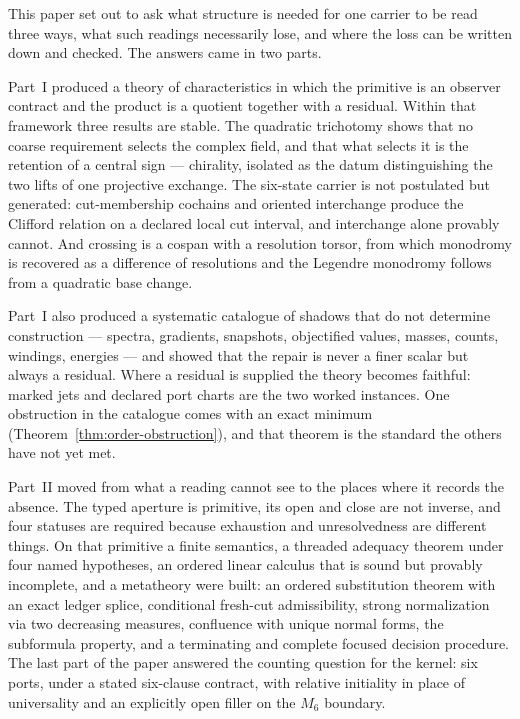 \label{sec:conclusion-body}

This paper set out to ask what structure is needed for one carrier to be read three ways,
what such readings necessarily lose, and where the loss can be written down and checked.  The
answers came in two parts.

Part~I produced a theory of characteristics in which the primitive is an observer contract
and the product is a quotient together with a residual.  Within that framework three results
are stable.  The quadratic trichotomy shows that no coarse requirement selects the complex
field, and that what selects it is the retention of a central sign --- chirality, isolated as
the datum distinguishing the two lifts of one projective exchange.  The six-state carrier is
not postulated but generated: cut-membership cochains and oriented interchange produce the
Clifford relation on a declared local cut interval, and interchange alone provably cannot.
And crossing is a cospan with a resolution torsor, from which monodromy is recovered as a
difference of resolutions and the Legendre monodromy follows from a quadratic base change.

Part~I also produced a systematic catalogue of shadows that do not determine construction ---
spectra, gradients, snapshots, objectified values, masses, counts, windings, energies --- and
showed that the repair is never a finer scalar but always a residual.  Where a residual is
supplied the theory becomes faithful: marked jets and declared port charts are the two
worked instances.  One obstruction in the catalogue comes with an exact minimum
(Theorem~\ref{thm:order-obstruction}), and that theorem is the standard the others have not
yet met.

Part~II moved from what a reading cannot see to the places where it records the absence.  The
typed aperture is primitive, its open and close are not inverse, and four statuses are
required because exhaustion and unresolvedness are different things.  On that primitive a
finite semantics, a threaded adequacy theorem under four named hypotheses, an ordered linear
calculus that is sound but provably incomplete, and a metatheory were built: an ordered
substitution theorem with an exact ledger splice, conditional fresh-cut admissibility, strong
normalization via two decreasing measures, confluence with unique normal forms, the
subformula property, and a terminating and complete focused decision procedure.  The last
part of the paper answered the counting question for the kernel: six ports, under a stated
six-clause contract, with relative initiality in place of universality and an explicitly open
filler on the $M_6$ boundary.

